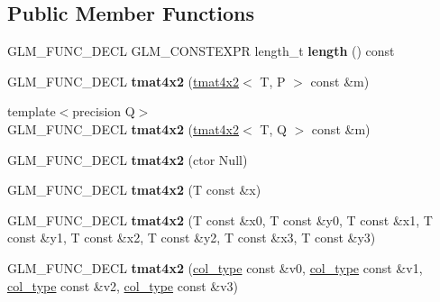 \subsection*{Public Member Functions}
\begin{DoxyCompactItemize}
\item 
G\+L\+M\+\_\+\+F\+U\+N\+C\+\_\+\+D\+E\+CL G\+L\+M\+\_\+\+C\+O\+N\+S\+T\+E\+X\+PR length\+\_\+t {\bfseries length} () const \hypertarget{structglm_1_1detail_1_1tmat4x2_a25a9d035af6990fb0610cd1e37adc445}{}\label{structglm_1_1detail_1_1tmat4x2_a25a9d035af6990fb0610cd1e37adc445}

\item 
G\+L\+M\+\_\+\+F\+U\+N\+C\+\_\+\+D\+E\+CL {\bfseries tmat4x2} (\hyperlink{structglm_1_1detail_1_1tmat4x2}{tmat4x2}$<$ T, P $>$ const \&m)\hypertarget{structglm_1_1detail_1_1tmat4x2_ab3c1fcf781e0219e317fde204095696a}{}\label{structglm_1_1detail_1_1tmat4x2_ab3c1fcf781e0219e317fde204095696a}

\item 
{\footnotesize template$<$precision Q$>$ }\\G\+L\+M\+\_\+\+F\+U\+N\+C\+\_\+\+D\+E\+CL {\bfseries tmat4x2} (\hyperlink{structglm_1_1detail_1_1tmat4x2}{tmat4x2}$<$ T, Q $>$ const \&m)\hypertarget{structglm_1_1detail_1_1tmat4x2_ac81c7bdc54e869320b7fe713ef361f4c}{}\label{structglm_1_1detail_1_1tmat4x2_ac81c7bdc54e869320b7fe713ef361f4c}

\item 
G\+L\+M\+\_\+\+F\+U\+N\+C\+\_\+\+D\+E\+CL {\bfseries tmat4x2} (ctor Null)\hypertarget{structglm_1_1detail_1_1tmat4x2_a2abefa2846a92e5b1f5efc365a784791}{}\label{structglm_1_1detail_1_1tmat4x2_a2abefa2846a92e5b1f5efc365a784791}

\item 
G\+L\+M\+\_\+\+F\+U\+N\+C\+\_\+\+D\+E\+CL {\bfseries tmat4x2} (T const \&x)\hypertarget{structglm_1_1detail_1_1tmat4x2_a7e8cb6213554a2961c3725c89e3eb168}{}\label{structglm_1_1detail_1_1tmat4x2_a7e8cb6213554a2961c3725c89e3eb168}

\item 
G\+L\+M\+\_\+\+F\+U\+N\+C\+\_\+\+D\+E\+CL {\bfseries tmat4x2} (T const \&x0, T const \&y0, T const \&x1, T const \&y1, T const \&x2, T const \&y2, T const \&x3, T const \&y3)\hypertarget{structglm_1_1detail_1_1tmat4x2_af11c8214ce2df13c925feeae262c1916}{}\label{structglm_1_1detail_1_1tmat4x2_af11c8214ce2df13c925feeae262c1916}

\item 
G\+L\+M\+\_\+\+F\+U\+N\+C\+\_\+\+D\+E\+CL {\bfseries tmat4x2} (\hyperlink{structglm_1_1detail_1_1tvec2}{col\+\_\+type} const \&v0, \hyperlink{structglm_1_1detail_1_1tvec2}{col\+\_\+type} const \&v1, \hyperlink{structglm_1_1detail_1_1tvec2}{col\+\_\+type} const \&v2, \hyperlink{structglm_1_1detail_1_1tvec2}{col\+\_\+type} const \&v3)\hypertarget{structglm_1_1detail_1_1tmat4x2_a5e5749116ce86b6d1d0bd43d6c2158b0}{}\label{structglm_1_1detail_1_1tmat4x2_a5e5749116ce86b6d1d0bd43d6c2158b0}


\end{DoxyCompactItemize}
